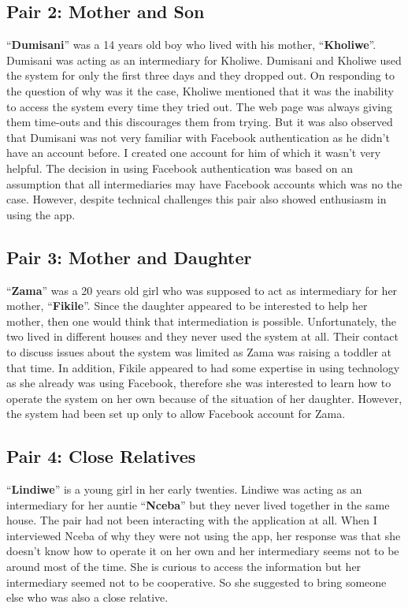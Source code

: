 \subsection*{\textbf{Pair 2: Mother and Son}}
``\textbf{Dumisani}'' was a 14 years old boy who lived with his mother, ``\textbf{Kholiwe}''. Dumisani was acting as an intermediary for Kholiwe. Dumisani and Kholiwe used the system for only the first three days and they dropped out. On responding to the question of why was it the case, Kholiwe mentioned that it was the inability to access the system every time they tried out. The web page was always giving them time-outs and this discourages them from trying. But it was also observed that Dumisani was not very familiar with Facebook authentication as he didn't have an account before. I created one account for him of which it wasn't very helpful. The decision in using Facebook authentication was based on an assumption that all intermediaries may have Facebook accounts which was no the case. However, despite technical challenges this pair also showed enthusiasm in using the app.
\subsection*{\textbf{Pair 3: Mother and Daughter}}
``\textbf{Zama}'' was a 20 years old girl who was supposed to act as intermediary for her mother, ``\textbf{Fikile}''.  Since the daughter appeared to be interested to help her mother, then one would think that intermediation is possible. Unfortunately, the two lived in different houses and they never used the system at all. Their contact to discuss issues about the system was limited as Zama was raising a toddler at that time. In addition, Fikile appeared to had some expertise in using technology as she already was using Facebook, therefore she was interested to learn how to operate the system on her own because of the situation of her daughter. However, the system had been set up only to allow Facebook account for Zama. 
\subsection*{\textbf{Pair 4: Close Relatives}}
``\textbf{Lindiwe}'' is a young girl in her early twenties. Lindiwe was acting as an intermediary for her auntie ``\textbf{Nceba}'' but they never lived together in the same house. The pair had not been interacting with the application at all. When I interviewed Nceba of why they were not using the app,  her response was that she doesn't know how to operate it on her own and her intermediary seems not  to be around most of the time. She is curious to access the information but her intermediary seemed not to be cooperative. So she suggested to bring someone else who was also a close relative.
